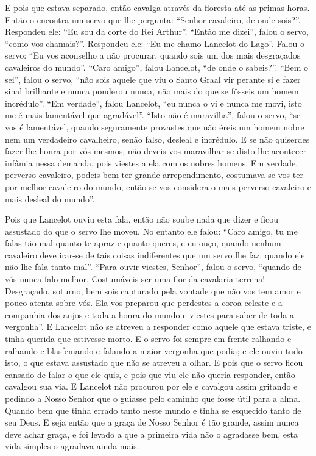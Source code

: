 E pois que estava separado, então cavalga através da floresta até as primas
horas. Então o encontra um servo que lhe pergunta: “Senhor cavaleiro, de onde
sois?”. Respondeu ele: “Eu sou da corte do Rei Arthur”. “Então me dizei”, falou
o servo, “como vos chamais?”. Respondeu ele: “Eu me chamo Lancelot do Lago”.
Falou o servo: “Eu vos aconselho a não procurar, quando sois um dos mais
desgraçados cavaleiros do mundo”. “Caro amigo”, falou Lancelot, “de onde o
sabeis?”. “Bem o sei”, falou o servo, “não sois aquele que viu o Santo Graal
vir perante si e fazer sinal brilhante e nunca ponderou nunca, não mais do que
se fôsseis um homem incrédulo”. “Em verdade”, falou Lancelot, “eu nunca o vi e
nunca me movi, isto me é mais lamentável que agradável”. “Isto não é
maravilha”, falou o servo, “se vos é lamentável, quando seguramente provastes
que não éreis um homem nobre nem um verdadeiro cavalheiro, senão falso, desleal
e incrédulo. E se não quiserdes fazer-lhe honra por vós mesmos, não deveis vos
maravilhar se disto lhe acontecer infâmia nessa demanda, pois viestes a ela com
os nobres homens. Em verdade, perverso cavaleiro, podeis bem ter grande
arrependimento, costumava-se vos ter por melhor cavaleiro do mundo, então se
vos considera o mais perverso cavaleiro e mais desleal do mundo”. 

Pois que Lancelot ouviu esta fala, então não soube nada que dizer e ficou
assustado do que o servo lhe moveu. No entanto ele falou: “Caro amigo, tu me
falas tão mal quanto te apraz e quanto queres, e eu ouço, quando nenhum
cavaleiro deve irar-se de tais coisas indiferentes que um servo lhe faz, quando
ele não lhe fala tanto mal”. “Para ouvir viestes, Senhor”, falou o
servo, “quando de vós nunca falo melhor. Costumáveis ser uma flor da cavalaria
terrena! Desgraçado, soturno, bem sois capturado pela vontade que não vos tem
amor e pouco atenta sobre vós. Ela vos preparou que perdestes a coroa celeste e
a companhia dos anjos e toda a honra do mundo e viestes para saber de toda a
vergonha”. E Lancelot não se atreveu a responder como aquele que estava
triste, e tinha querida que estivesse morto. E o servo foi sempre em frente
ralhando e ralhando e blasfemando e falando a maior vergonha que podia; e ele
ouviu tudo isto, o que estava assustado que não se atreveu a olhar. E pois que
o servo ficou cansado de falar o que ele quis, e pois que viu ele não queria
responder, então cavalgou sua via. E Lancelot não procurou por ele e cavalgou
assim gritando e pedindo a Nosso Senhor que o guiasse pelo caminho que fosse
útil para a alma. Quando bem que tinha errado tanto neste mundo e tinha se
esquecido tanto de seu Deus. E seja então que a graça de Nosso Senhor é tão
grande, assim nunca deve achar graça, e foi levado a que a primeira vida não o
agradasse bem, esta vida simples o agradava ainda mais. 

